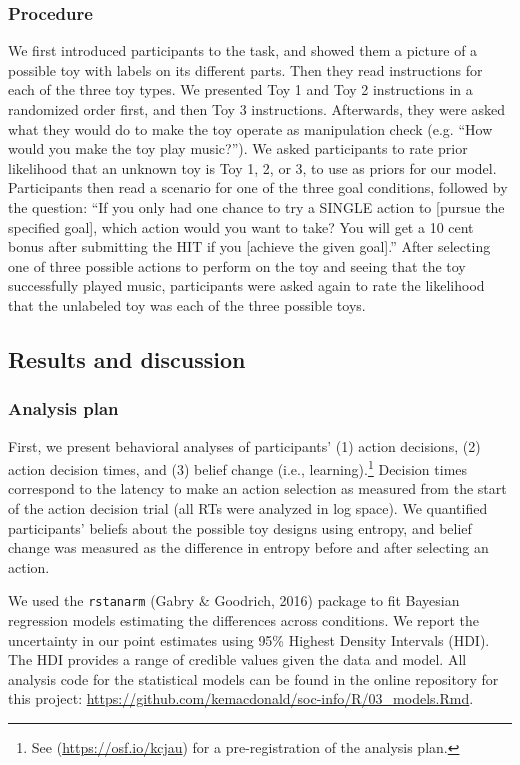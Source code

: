 \documentclass[10pt, letterpaper]{article}
\begin{document}
\subsubsection{Procedure}\label{procedure}

We first introduced participants to the task, and showed them a picture
of a possible toy with labels on its different parts. Then they read
instructions for each of the three toy types. We presented Toy 1 and Toy
2 instructions in a randomized order first, and then Toy 3 instructions.
Afterwards, they were asked what they would do to make the toy operate
as manipulation check (e.g. ``How would you make the toy play music?'').
We asked participants to rate prior likelihood that an unknown toy is
Toy 1, 2, or 3, to use as priors for our model. Participants then read a
scenario for one of the three goal conditions, followed by the question:
``If you only had one chance to try a SINGLE action to {[}pursue the
specified goal{]}, which action would you want to take? You will get a
10 cent bonus after submitting the HIT if you {[}achieve the given
goal{]}.'' After selecting one of three possible actions to perform on
the toy and seeing that the toy successfully played music, participants
were asked again to rate the likelihood that the unlabeled toy was each
of the three possible toys.

\subsection{Results and discussion}\label{results-and-discussion}

\subsubsection{Analysis plan}\label{analysis-plan}

First, we present behavioral analyses of participants' (1) action
decisions, (2) action decision times, and (3) belief change (i.e.,
learning).\footnote{See (\url{https://osf.io/kcjau}) for a
  pre-registration of the analysis plan.} Decision times correspond to
the latency to make an action selection as measured from the start of
the action decision trial (all RTs were analyzed in log space). We
quantified participants' beliefs about the possible toy designs using
entropy, and belief change was measured as the difference in entropy
before and after selecting an action.

We used the \texttt{rstanarm} (Gabry \& Goodrich, 2016) package to fit
Bayesian regression models estimating the differences across conditions.
We report the uncertainty in our point estimates using 95\% Highest
Density Intervals (HDI). The HDI provides a range of credible values
given the data and model. All analysis code for the statistical models
can be found in the online repository for this project:
\url{https://github.com/kemacdonald/soc-info/R/03_models.Rmd}.
\end{document}
